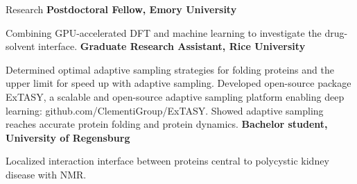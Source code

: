 \begin{rubric}{Research}
%
	\textbf{Postdoctoral Fellow, Emory University}
  \par Combining GPU-accelerated DFT and machine learning to investigate the drug-solvent interface. 
\entry*[2014 -- 2020]%
  \textbf{Graduate Research Assistant, Rice University}
  \par Determined optimal adaptive sampling strategies for folding proteins and the upper limit for speed up with adaptive sampling. Developed open-source package ExTASY, a scalable and open-source adaptive sampling platform enabling deep learning: github.com/ClementiGroup/ExTASY. Showed adaptive sampling reaches accurate protein folding and protein dynamics.
\entry*[2012]%
  \textbf{Bachelor student, University of Regensburg}
  \par Localized interaction interface between proteins central to polycystic kidney disease with NMR.
\end{rubric}

